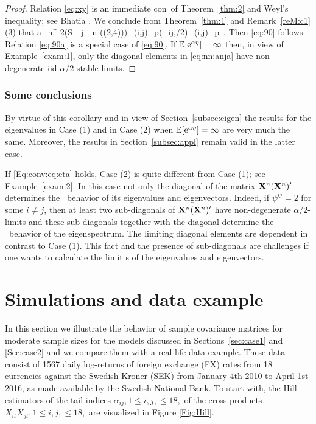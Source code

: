 \begin{proof} Relation \eqref{eq:xy} is an immediate con\seq\ of Theorem~\ref{thm:2} and Weyl's inequality; 
see Bhatia \cite{bhatia:1997}. We conclude  from Theorem~\ref{thm:1} and Remark~\ref{reM:c1}(3) that
\beam\label{eq:nn:anja}
a_n^{-2}\big(S_{ij}  - n\,\E[X^2]\,\I (\alpha\in (2,4))\big)_{(i,j)\in \Gamma_p}\std \big(\xi_{ij,\alpha/2}\big)_{(i,j)\in \Gamma_p} \,.
\eeam
Then \eqref{eq:90} follows. Relation \eqref{eq:90a} is a special case of \eqref{eq:90}. If ${\mathbb E} [{\rm e}^{\alpha\eta}]=\infty$ then, 
in view of Example~\ref{exam:1}, only the diagonal elements in \eqref{eq:nn:anja} have non-degenerate iid $\alpha/2$-stable limits.
\end{proof}
\subsubsection*{Some conclusions}
By virtue of this corollary and in view of Section~\ref{subsec:eigen} the results for the eigenvalues 
in Case (1) and in Case (2) when ${\mathbb E} [{\rm e}^{\alpha\eta}]=\infty$ are very much the same. Moreover, the results in 
Section~\ref{subsec:appl} remain valid in the latter case.
\par
If \eqref{Eq:conv:eq:eta} holds, Case (2) is quite different from Case (1); see Example~\ref{exam:2}.
In this case not only the diagonal of the matrix ${\bf X}^n({\bf X}^n)'$ determines the
\asy\ behavior of its eigenvalues and eigenvectors. Indeed, if $\psi^{ij}=2$ for some $i\ne j$, then
at least two sub-diagonals of ${\bf X}^n({\bf X}^n)'$ have non-degenerate $\alpha/2$-limits and these sub-diagonals together
with the diagonal determine the \asy\ behavior of the eigenspectrum. The limiting diagonal elements are dependent
in contrast to Case (1). This fact and the presence of sub-diagonals are challenges if one wants to calculate
the limit \ds s of the eigenvalues and eigenvectors.
\section{Simulations and data example}\label{sec:simulation}
In this section we illustrate the behavior of sample covariance matrices for moderate sample sizes
for the models discussed in Sections~\ref{sec:case1} and \ref{Sec:case2} 
and we compare them with a real-life data example. These data consist of
1567 daily log-returns of foreign exchange (FX) rates from
18 currencies against the Swedish Kroner (SEK) from January 4th 2010 to April 1st 2016, as made available by the Swedish National Bank. To start with, the Hill estimators of the tail indices $\alpha_{ij}, 1 \leq i,j, \leq 18,$ of the cross 
products $X_{it}X_{jt}, 1 \leq i,j, \leq 18,$ are visualized in Figure
\ref{Fig:Hill}.

